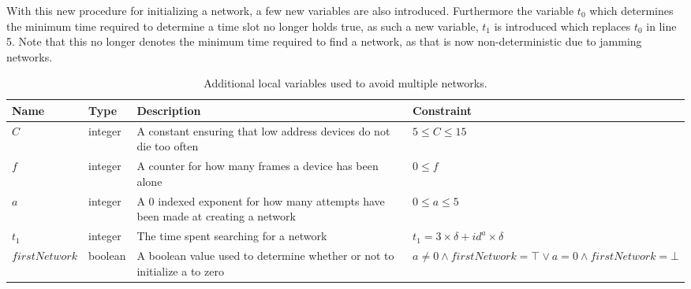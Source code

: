 With this new procedure for initializing a network, a few new variables are also introduced.
Furthermore the variable $t_0$ which determines the minimum time required to determine a time slot no longer holds true, as such a new variable, $t_1$ is introduced which replaces $t_0$ in  line 5.
Note that this no longer denotes the minimum time required to find a network, as that is now non-deterministic due to jamming networks.
\begin{table}[h]
    {\setlength{\extrarowheight}{1ex}%
    \begin{tabularx}{\textwidth}{l|l|X|l}
        \toprule
        Name                & Type      & Description & Constraint \\
        \midrule
        $C$                 & integer   & A constant ensuring that low address devices do not die too often                 & $5 \leq C \leq 15$      \\
        $f$                 & integer   & A counter for how many frames a device has been alone                             & $0 \leq f$  \\
        $a$                 & integer   & A 0 indexed exponent for how many attempts have been made at creating a network   & $0 \leq a \leq 5$     \\
        $t_1$               & integer   & The time spent searching for a network                                            & $t_1 = 3 \times \delta + id^a \times \delta$     \\
        $firstNetwork$      & boolean   & A boolean value used to determine whether or not to initialize a to zero          & $a \neq 0 \land firstNetwork = \top \lor a = 0 \land firstNetwork = \bot$     \\

        \bottomrule
    \end{tabularx}}
    \caption{Additional local variables used to avoid multiple networks.}
    \label{tab:locals_wmulticonnect}
\end{table}